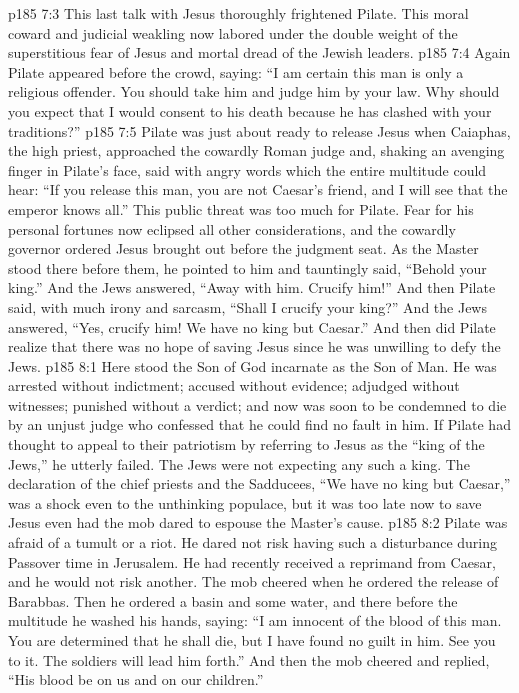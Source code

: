 \vs p185 7:3 This last talk with Jesus thoroughly frightened Pilate. This moral coward and judicial weakling now labored under the double weight of the superstitious fear of Jesus and mortal dread of the Jewish leaders.
\vs p185 7:4 Again Pilate appeared before the crowd, saying: “I am certain this man is only a religious offender. You should take him and judge him by your law. Why should you expect that I would consent to his death because he has clashed with your traditions?”
\vs p185 7:5 Pilate was just about ready to release Jesus when Caiaphas, the high priest, approached the cowardly Roman judge and, shaking an avenging finger in Pilate’s face, said with angry words which the entire multitude could hear: “If you release this man, you are not Caesar’s friend, and I will see that the emperor knows all.” This public threat was too much for Pilate. Fear for his personal fortunes now eclipsed all other considerations, and the cowardly governor ordered Jesus brought out before the judgment seat. As the Master stood there before them, he pointed to him and tauntingly said, “Behold your king.” And the Jews answered, “Away with him. Crucify him!” And then Pilate said, with much irony and sarcasm, “Shall I crucify your king?” And the Jews answered, “Yes, crucify him! We have no king but Caesar.” And then did Pilate realize that there was no hope of saving Jesus since he was unwilling to defy the Jews.\plusone
{}
\vs p185 8:1 Here stood the Son of God incarnate as the Son of Man. He was arrested without indictment; accused without evidence; adjudged without witnesses; punished without a verdict; and now was soon to be condemned to die by an unjust judge who confessed that he could find no fault in him. If Pilate had thought to appeal to their patriotism by referring to Jesus as the “king of the Jews,” he utterly failed. The Jews were not expecting any such a king. The declaration of the chief priests and the Sadducees, “We have no king but Caesar,” was a shock even to the unthinking populace, but it was too late now to save Jesus even had the mob dared to espouse the Master’s cause.
\pc \vs p185 8:2 Pilate was afraid of a tumult or a riot. He dared not risk having such a disturbance during Passover time in Jerusalem. He had recently received a reprimand from Caesar, and he would not risk another. The mob cheered when he ordered the release of Barabbas. Then he ordered a basin and some water, and there before the multitude he washed his hands, saying: “I am innocent of the blood of this man. You are determined that he shall die, but I have found no guilt in him. See you to it. The soldiers will lead him forth.” And then the mob cheered and replied, “His blood be on us and on our children.”\plustwo
